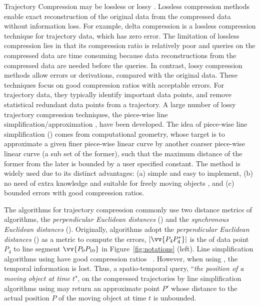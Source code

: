 Trajectory Compression may be lossless or lossy \cite{Muckell:Compression}.
%
Lossless compression methods enable exact reconstruction of the original data from the compressed data without information loss. For example, delta compression \cite{Nibali:Trajic} is a lossless compression technique for trajectory data, which has zero error.
The limitation of lossless compression lies in that its compression ratio is relatively poor \cite{Nibali:Trajic} and {queries on the compressed data are time consuming because data reconstructions from the compressed data are needed before the queries}.
%
In contrast, lossy compression methods allow errors or derivations, compared with the original data.
These techniques focus on good compression ratios with acceptable errors. For trajectory data, they typically identify important data points, and remove statistical redundant data points from a trajectory.
A large number of lossy trajectory compression techniques, \eg the piece-wise line {simplification/approximation} \cite{Douglas:Peucker, Hershberger:Speeding, Keogh:online,Liu:BQS, Muckell:Compression, Chen:Trajectory, Chen:Fast, Cao:Spatio, Shi:Survey}, have been developed.
The idea of piece-wise line simplification (\lsa) comes from computational geometry, whose target is to approximate a given finer piece-wise linear curve by another coarser piece-wise linear curve (a sub set of the former), such that the maximum distance of the former from the later is bounded by a user specified constant. 
The \lsa method is widely used due to its distinct advantages: (a) simple and easy to implement, (b) no need of extra knowledge and suitable for freely  moving  objects \cite{Popa:Spatio}, and (c) bounded errors with good compression ratios.

The \lsa algorithms for trajectory compression commonly use two distance metrics of \lsa algorithms, \ie the \emph{perpendicular Euclidean distances} (\ped) and the \emph{synchronous Euclidean distances} (\sed).
Originally, \lsa algorithms adopt the \emph{perpendicular Euclidean distances} (\ped) as a metric to compute the errors,
\eg $|\vv{P_4P^*_4}|$ is the \ped of data point $P_4$ to line segment $\vv{P_0P_{10}}$ in Figure~\ref{fig:notations} (left).
Line simplification algorithms using \ped have good compression ratios~ \cite{Douglas:Peucker, Hershberger:Speeding, Liu:BQS, Muckell:Compression, Chen:Trajectory, Cao:Spatio, Shi:Survey}.  However, when using \ped, the temporal information is lost. Thus, a spatio-temporal query, \eg ``\emph{the position of a moving object at time $t$}", on the compressed trajectories by line simplification algorithms using \ped may return an approximate point $P'$ whose distance to the actual position $P$ of the moving object at time $t$ is unbounded. %



